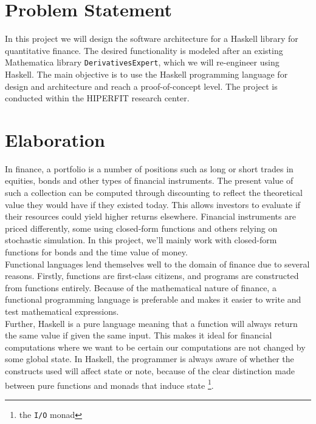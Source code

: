 \documentclass[11pt]{article}
\begin{document}
\section*{Problem Statement}

In this project we will design the software architecture for a Haskell library for quantitative finance.
The desired functionality is modeled after an existing Mathematica library {\tt DerivativesExpert}, which
we will re-engineer using Haskell.
The main objective is to use the Haskell programming language for design and architecture and reach a proof-of-concept level.
The project is conducted within the HIPERFIT research center.

\section*{Elaboration}

In finance, a portfolio is a number of positions such as long or short trades in equities, bonds and other
types of financial instruments. The present value of such a collection can be computed through
discounting to reflect the theoretical value they would have if they existed today. This allows
investors to evaluate if their resources could yield higher returns elsewhere.
Financial instruments are priced differently, some using closed-form functions and
others relying on stochastic simulation. In this project, we'll mainly work with closed-form functions for bonds and
the time value of money.\\

Functional languages lend themselves well to the domain of finance due
to several reasons. Firstly, functions are first-class citizens, and programs are constructed
from functions entirely. Because of the mathematical nature of finance, a functional
programming language is preferable and makes it easier to write and test mathematical expressions.\\

Further, Haskell is a pure language meaning that a function will always return the same value
if given the same input. This makes it ideal for
financial computations where we want to be certain our computations are not changed by some
global state. In Haskell, the programmer is always aware of whether the constructs used will affect
state or note, because of the clear distinction made between pure functions and  monads that induce state \footnote{the \texttt{I/O} monad}.\\
\end{document}
